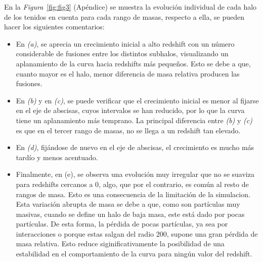 \begin{comment}
La \textit{Figura}~\ref{fig:fig1} representa la evolución de los halos para cada rango de la \textit{Tabla}~\ref{tab:tabla2}. En general, se observan intervalos de crecimiento negativo, lo cuál no tiene una explicación física congruente. Estos decrecimientos son una consecuencia de las limitaciones del modelo y se explican entendiendo que, para un \textit{SnapNum} determinado, halos más pequeños salen fuera del radio 200 del halo principal (radio en que la sobredensidad es 200 veces la crítica de la simulación), dejando de ser considerados, sustrayendo así la masa correspondiente. Posteriormente, este decrecimiento se recupera gracias al colapso gravitacional. Los halos que habían salido vuelven a incluirse en el espacio que abarca el radio del virial del halo principal. \\
\end{comment}

En la \textit{Figura}~\ref{fig:fig3} (Apéndice) se muestra la evolución individual de cada halo de los tenidos en cuenta para cada rango de masas, respecto a ella, se pueden hacer los siguientes comentarios:
\begin{itemize}
\item En \textit{(a)}, se aprecia un crecimiento inicial a alto redshift con un número considerable de fusiones entre los distintos subhalos, visualizando un aplanamiento de la curva hacia redshifts más pequeños. Esto se debe a que, cuanto mayor es el halo, menor diferencia de masa relativa producen las fusiones. 
\item En \textit{(b)} y en \textit{(c)}, se puede verificar que el crecimiento inicial es menor al fijarse en el eje de abscisas, cuyos intervalos se han reducido, por lo que la curva tiene un aplanamiento más temprano. La principal diferencia entre \textit{(b)} y \textit{(c)} es que en el tercer rango de masas, no se llega a un redshift tan elevado. 
\item En \textit{(d)}, fijándose de nuevo en el eje de abscisas, el crecimiento es mucho más tardío y menos acentuado. 
\item Finalmente, en (e), se observa una evolución muy irregular que no se suaviza para redshifts cercanos a 0, algo, que por el contrario, es común al resto de rangos de masa. Esto es una consecuencia de la limitación de la simulacion. Esta variación abrupta de masa se debe a que, como son partículas muy masivas, cuando se define un halo de baja masa, este está dado por pocas partículas. De esta forma, la pérdida de pocas partículas, ya sea por interacciones o porque estas salgan del radio 200, supone una gran pérdida de masa relativa. Esto reduce siginificativamente la posibilidad de una estabilidad en el comportamiento de la curva para ningún valor del redshift.
\end{itemize}
\\

